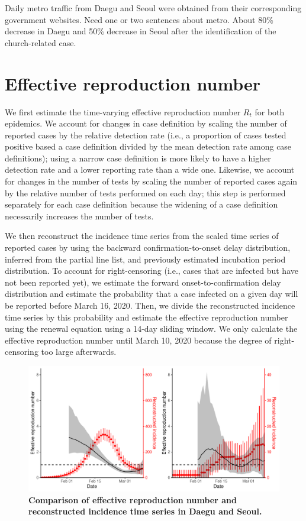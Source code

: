 \documentclass[12pt]{article}
\begin{document}
Daily metro traffic from Daegu and Seoul were obtained from their corresponding government websites.
Need one or two sentences about metro. 
About 80\% decrease in Daegu and 50\% decrease in Seoul after the identification of the church-related case.


\section{Effective reproduction number}

We first estimate the time-varying effective reproduction number $R_t$ for both epidemics.
We account for changes in case definition by scaling the number of reported cases by the relative detection rate (i.e., a proportion of cases tested positive based a case definition divided by the mean detection rate among case definitions); 
using a narrow case definition is more likely to have a higher detection rate and a lower reporting rate than a wide one.
Likewise, we account for changes in the number of tests by scaling the number of reported cases again by the relative number of tests performed on each day; this step is performed separately for each case definition because the widening of a case definition necessarily increases the number of tests.

We then reconstruct the incidence time series from the scaled time series of reported cases by using the backward confirmation-to-onset delay distribution, inferred from the partial line list, and previously estimated incubation period distribution.
To account for right-censoring (i.e., cases that are infected but have not been reported yet), we estimate the forward onset-to-confirmation delay distribution and estimate the probability that a case infected on a given day will be reported before March 16, 2020. 
Then, we divide the reconstructed incidence time series by this probability and estimate the effective reproduction number using the renewal equation using a 14-day sliding window.
We only calculate the effective reproduction number until March 10, 2020 because the degree of right-censoring too large afterwards.

\begin{figure}[!ht]
\includegraphics[width=\textwidth]{figure_compare_R_t.pdf}
\caption{
\textbf{Comparison of effective reproduction number and reconstructed incidence time series in Daegu and Seoul.}
}
\label{fig:eff}
\end{figure}
\end{document}
